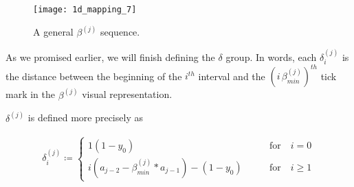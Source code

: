 \begin{figure}[H]
  \begin{center}
    \texttt{[image: 1d\_mapping\_7]}
  \end{center}
  \vspace{-.2in} %
  \caption{\label{fig:beta-sequence-j} A general $\beta^{(j)}$ sequence.}
\end{figure}

As we promised earlier, we will finish defining the $\delta$ group. In words, each $\delta^{(j)}_i$ is the distance between the beginning of the $i^{th}$ interval and the $(i \, \beta^{(j)}_{min})^{th}$ tick mark in the $\beta^{(j)}$ visual representation.

\begin{definition}
  $\delta^{(j)}$ is defined more precisely as

  \begin{align}\label{delta_beta}
    \delta^{(j)}_i \coloneqq \begin{cases}
      1(1-y_0) \qquad &\text{for} \quad i = 0\\
      i (a_{j-2} - \beta^{(j)}_{min} * a_{j-1}) - (1-y_0) \qquad &\text{for} \quad i \ge 1
    \end{cases}
  \end{align}
\end{definition}


